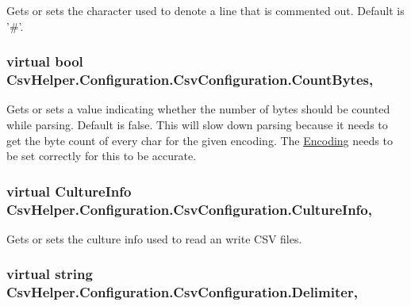 Gets or sets the character used to denote a line that is commented out. Default is '\#'. 

\hypertarget{a00043_af774e3cb6d18788006deec71879f54a1}{
\subsubsection[{Count\-Bytes}]{\setlength{\rightskip}{0pt plus 5cm}virtual bool Csv\-Helper.\-Configuration.\-Csv\-Configuration.\-Count\-Bytes\hspace{0.3cm}{\ttfamily [get]}, {\ttfamily [set]}}}\label{a00043_af774e3cb6d18788006deec71879f54a1}


Gets or sets a value indicating whether the number of bytes should be counted while parsing. Default is false. This will slow down parsing because it needs to get the byte count of every char for the given encoding. The \hyperlink{a00043_a28a7819a63acdc5982093ce3b84102d8}{Encoding} needs to be set correctly for this to be accurate. 

\hypertarget{a00043_ad04ccfdd3cbc265f527ee5baa2e08508}{
\subsubsection[{Culture\-Info}]{\setlength{\rightskip}{0pt plus 5cm}virtual Culture\-Info Csv\-Helper.\-Configuration.\-Csv\-Configuration.\-Culture\-Info\hspace{0.3cm}{\ttfamily [get]}, {\ttfamily [set]}}}\label{a00043_ad04ccfdd3cbc265f527ee5baa2e08508}


Gets or sets the culture info used to read an write C\-S\-V files. 

\hypertarget{a00043_a611063826803f98b7cfc275247c1d883}{
\subsubsection[{Delimiter}]{\setlength{\rightskip}{0pt plus 5cm}virtual string Csv\-Helper.\-Configuration.\-Csv\-Configuration.\-Delimiter\hspace{0.3cm}{\ttfamily [get]}, {\ttfamily [set]}}}\label{a00043_a611063826803f98b7cfc275247c1d883}


